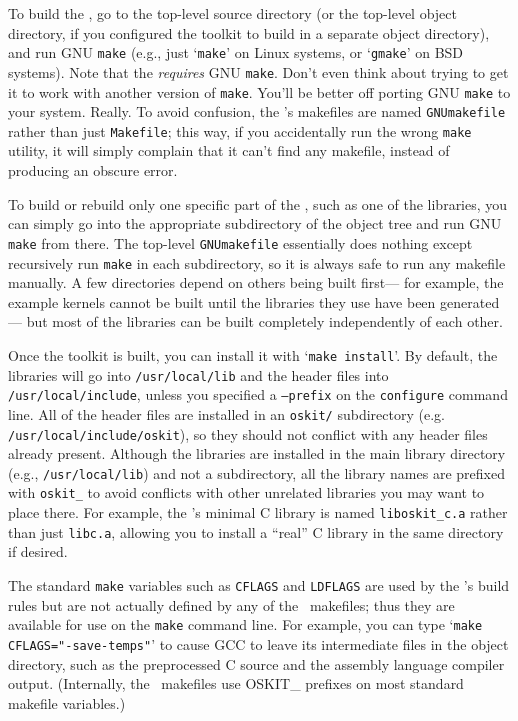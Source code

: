 To build the \oskit{},
go to the top-level source directory
(or the top-level object directory,
if you configured the toolkit to build in a separate object directory),
and run GNU {\tt make}
(e.g., just `{\tt make}' on Linux systems,
or `{\tt gmake}' on BSD systems).
Note that the \oskit{} \emph{requires} GNU {\tt make}.
Don't even think about trying to get it to work
with another version of \texttt{make}.
You'll be better off porting GNU \texttt{make} to your system.  Really.
To avoid confusion, the \oskit{}'s makefiles are named {\tt GNUmakefile}
rather than just {\tt Makefile};
this way, if you accidentally run the wrong {\tt make} utility,
it will simply complain that it can't find any makefile,
instead of producing an obscure error.

To build or rebuild only one specific part of the \oskit,
such as one of the libraries,
you can simply go into the appropriate subdirectory of the object tree
and run GNU \texttt{make} from there.
The top-level {\tt GNUmakefile} essentially does nothing
except recursively run \texttt{make} in each subdirectory,
so it is always safe to run any \oskit{} makefile manually.
A few \oskit{} directories depend on others being built first---%
for example, the example kernels cannot be built
until the \oskit{} libraries they use have been generated---%
but most of the \oskit{} libraries can be built
completely independently of each other.

Once the toolkit is built, you can install it with `{\tt make install}'.
By default, the libraries will go into {\tt /usr/local/lib}
and the header files into {\tt /usr/local/include},
unless you specified a {\tt --prefix} on the {\tt configure} command line.
All of the \oskit{} header files are installed in an {\tt oskit/} subdirectory
(e.g. {\tt /usr/local/include/oskit}),
so they should not conflict with any header files already present.
Although the libraries are installed in the main library directory
(e.g., {\tt /usr/local/lib}) and not a subdirectory,
all the library names are prefixed with \texttt{oskit_}
to avoid conflicts with other unrelated libraries you may want to place there.
For example, the \oskit's minimal C library
is named \texttt{liboskit_c.a} rather than just \texttt{libc.a},
allowing you to install a ``real'' C library in the same directory if desired.

The standard \texttt{make} variables
such as \texttt{CFLAGS} and \texttt{LDFLAGS}
are used by the \oskit's build rules
but are not actually defined by any of the \oskit\ makefiles;
thus they are available for use on the \texttt{make} command line.
For example, you can type `{\tt make CFLAGS="-save-temps"}'
to cause GCC to leave its intermediate files in the object directory,
such as the preprocessed C source and the assembly language compiler output.
(Internally, the \oskit\ makefiles use OSKIT_ prefixes on most
standard makefile variables.)

